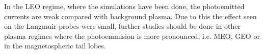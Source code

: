 
In the LEO regime, where the simulations have been done, the photoemitted currents are weak compared with
background plasma. Due to this the effect seen on the Langmuir probes were small, further studies should be done
in other plasma regimes where the photoemmision is more pronounced, i.e. MEO, GEO or in the magnetospheric tail lobes.
